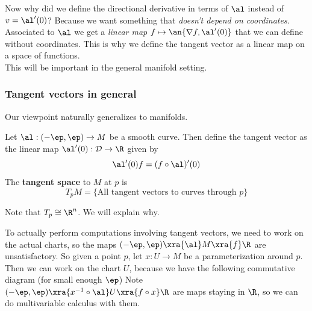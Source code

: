 Now why did we define the directional derivative in terms of $\al$ instead of $v=\al'(0)$? Because we want something that {\it doesn't depend on coordinates}. Associated to $\al$ we get a {\it linear map} $f\mapsto \an{\nabla f,\al'(0)}$ that we can define without coordinates. This is why we define the tangent vector as a linear map on a space of functions.\\

\vskip0.15in
This will be important in the general manifold setting.

%
%



\subsubsection{Tangent vectors in general}
Our viewpoint naturally generalizes to manifolds.
\begin{df}
Let $\al:(-\ep,\ep)\to M$ be a smooth curve. Then define the tangent vector as the linear map $\al'(0):\cal D\to \R$ given by
\[
\al'(0)f=(f\circ \al)'(0)
\]
The \textbf{tangent space} to $M$ at $p$ is
\[
T_pM=\{\text{All tangent vectors to curves through }p\}
\]
\end{df}
Note that $T_p\cong \R^n$. We will explain why.

To actually perform computations involving tangent vectors, we need to work on the actual charts, so the maps $(-\ep,\ep)\xra{\al} M \xra{f} \R$ are unsatisfactory. So given a point $p$, let
$x:U\to M$ be a parameterization around $p$. Then we can work on the chart $U$, because we have the following commutative diagram (for small enough $\ep$)
\eeq 
Note $(-\ep,\ep)\xra{x^{-1}\circ \al}U\xra{f\circ x}\R$ are maps staying in $\R$, so we can do multivariable calculus with them.

